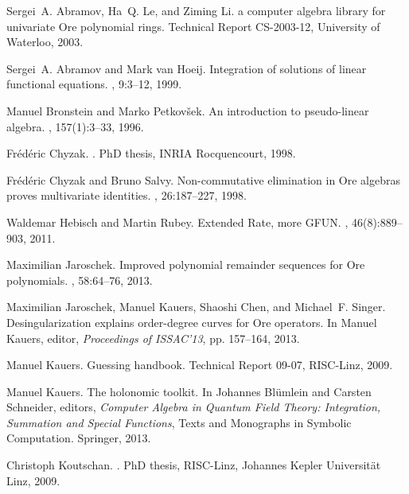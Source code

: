\documentclass{llncs}
\begin{document}
\begin{thebibliography}{10}

Sergei~A. Abramov, Ha~Q. Le, and Ziming Li.
 a computer algebra library for univariate Ore polynomial
  rings.
\newblock Technical Report CS-2003-12, University of Waterloo, 2003.

Sergei~A. Abramov and Mark van Hoeij.
\newblock Integration of solutions of linear functional equations.
, 9:3--12, 1999.

Manuel Bronstein and Marko Petkov{\v s}ek.
\newblock An introduction to pseudo-linear algebra.
, 157(1):3--33, 1996.

Fr{\'e}d{\'e}ric Chyzak.
.
\newblock PhD thesis, INRIA Rocquencourt, 1998.

Fr{\'e}d{\'e}ric Chyzak and Bruno Salvy.
\newblock Non-commutative elimination in {O}re algebras proves multivariate
  identities.
, 26:187--227, 1998.

Waldemar Hebisch and Martin Rubey.
\newblock Extended {R}ate, more {GFUN}.
, 46(8):889--903, 2011.

Maximilian Jaroschek.
\newblock Improved polynomial remainder sequences for {Ore} polynomials.
, 58:64--76, 2013.

Maximilian Jaroschek, Manuel Kauers, Shaoshi Chen, and Michael~F. Singer.
\newblock Desingularization explains order-degree curves for {Ore} operators.
\newblock In Manuel Kauers, editor, {\em Proceedings of ISSAC'13}, pp. 157--164, 2013.

Manuel Kauers.
\newblock Guessing handbook.
\newblock Technical Report 09-07, RISC-Linz, 2009.

Manuel Kauers.
\newblock The holonomic toolkit.
\newblock In Johannes Bl\"umlein and Carsten Schneider, editors, {\em Computer
  Algebra in Quantum Field Theory: Integration, Summation and Special
  Functions}, Texts and Monographs in Symbolic Computation. Springer, 2013.

Christoph Koutschan.
.
\newblock PhD thesis, RISC-Linz, Johannes Kepler Universit{\"a}t Linz, 2009.


\end{thebibliography}
\end{document}
